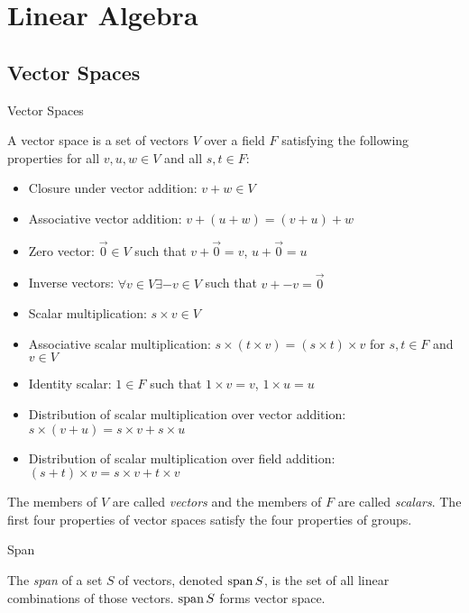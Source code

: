 \pagebreak



\section{Linear Algebra}

\subsection{Vector Spaces}

\begin{mybox}{Vector Spaces}

A vector space is a set of vectors $V$ over a field $F$ satisfying the following properties for all $v, u, w \in V$ and all $s, t \in F$:

\begin{itemize}
	\item Closure under vector addition: $v + w \in V$
	\item Associative vector addition: $v + (u + w) = (v + u) + w$
	\item Zero vector: $\vec{0} \in V$ such that $v + \vec{0} = v$, $u + \vec{0} = u$
	\item Inverse vectors: $\forall v \in V \exists -v \in V$ such that $v + -v = \vec{0}$
	\item Scalar multiplication: $s \times v \in V$
	\item Associative scalar multiplication: $s \times (t \times v) = (s \times t) \times v$ for $s, t \in F$ and $v \in V$
	\item Identity scalar: $1 \in F$ such that $1 \times v = v$, $1 \times u = u$
	\item Distribution of scalar multiplication over vector addition: $s \times (v+u) = s \times v + s \times u$
	\item Distribution of scalar multiplication over field addition: $(s + t) \times v = s \times v + t \times v$
\end{itemize}

The members of $V$ are called \textit{vectors} and the members of $F$ are called \textit{scalars}. The first four properties of vector spaces satisfy the four properties of groups.

\end{mybox}

\begin{mybox}{Span}

The \textit{span} of a set $S$ of vectors, denoted $\operatorname{span}{S}$, is the set of all linear combinations of those vectors. $\operatorname{span}{S}$ forms vector space.

\end{mybox}

